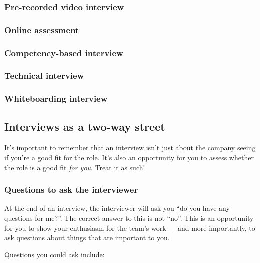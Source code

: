 \subsubsection{Pre-recorded video interview}
\subsubsection{Online assessment}
\subsubsection{Competency-based interview}
\subsubsection{Technical interview}
\subsubsection{Whiteboarding interview}

\subsection{Interviews as a two-way street}

It's important to remember that an interview isn't just about the company seeing if you're a good fit for the role. It's also an opportunity for you to assess whether the role is a good fit {\it for you}. Treat it as such! 

\subsubsection{Questions to ask the interviewer}
At the end of an interview, the interviewer will ask you ``do you have any questions for me?''. The correct answer to this is not ``no''. This is an opportunity for you to show your enthusiasm for the team's work --- and more importantly, to ask questions about things that are important to you. 

Questions you could ask include:

